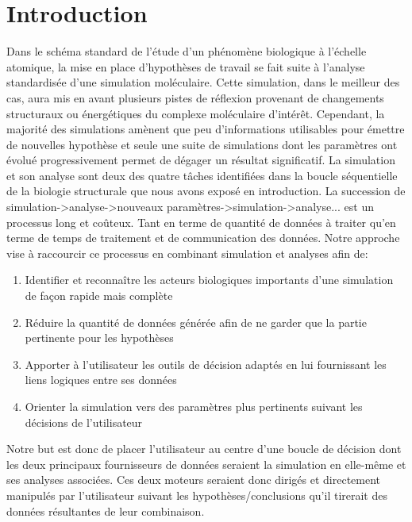 \section{Introduction}

Dans le schéma standard de l'étude d'un phénomène biologique à l'échelle atomique, la mise en place d'hypothèses de travail se fait suite à l'analyse standardisée d'une simulation moléculaire. Cette simulation, dans le meilleur des cas, aura mis en avant plusieurs pistes de réflexion provenant de changements structuraux ou énergétiques du complexe moléculaire d'intérêt. Cependant, la majorité des simulations amènent que peu d'informations utilisables pour émettre de nouvelles hypothèse et seule une suite de simulations dont les paramètres ont évolué progressivement permet de dégager un résultat significatif. La simulation et son analyse sont deux des quatre tâches identifiées dans la boucle séquentielle de la biologie structurale que nous avons exposé en introduction. La succession de simulation->analyse->nouveaux paramètres->simulation->analyse... est un processus long et coûteux. Tant en terme de quantité de données à traiter qu'en terme de temps de traitement et de communication des données. Notre approche vise à raccourcir ce processus en combinant simulation et analyses afin de:
\begin{enumerate}
    \item Identifier et reconnaître les acteurs biologiques importants d'une simulation de façon rapide mais complète
    \item Réduire la quantité de données générée afin de ne garder que la partie pertinente pour les hypothèses
    \item Apporter à l'utilisateur les outils de décision adaptés en lui fournissant les liens logiques entre ses données
    \item Orienter la simulation vers des paramètres plus pertinents suivant les décisions de l'utilisateur
\end{enumerate}

Notre but est donc de placer l'utilisateur au centre d'une boucle de décision dont les deux principaux fournisseurs de données seraient la simulation en elle-même et ses analyses associées. Ces deux moteurs seraient donc dirigés et directement manipulés par l'utilisateur suivant les hypothèses/conclusions qu'il tirerait des données résultantes de leur combinaison.


